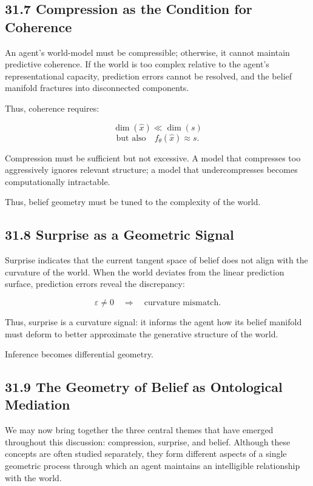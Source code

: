 \documentclass[12pt,letterpaper]{article}
\theoremstyle{remark}
\begin{document}
\subsection{31.7 Compression as the Condition for Coherence}

An agent’s world-model must be compressible; otherwise, it cannot maintain predictive coherence. If the world is too complex relative to the agent’s representational capacity, prediction errors cannot be resolved, and the belief manifold fractures into disconnected components.

Thus, coherence requires:

\[
\dim(\hat{x}) \ll \dim(s)
\]
\[
\text{but also} \quad f_\theta(\hat{x}) \approx s.
\]

Compression must be sufficient but not excessive.  
A model that compresses too aggressively ignores relevant structure; a model that undercompresses becomes computationally intractable.

Thus, belief geometry must be tuned to the complexity of the world.

\subsection{31.8 Surprise as a Geometric Signal}

Surprise indicates that the current tangent space of belief does not align with the curvature of the world. When the world deviates from the linear prediction surface, prediction errors reveal the discrepancy:

\[
\varepsilon \neq 0 \quad \Rightarrow \quad \text{curvature mismatch}.
\]

Thus, surprise is a curvature signal: it informs the agent how its belief manifold must deform to better approximate the generative structure of the world.

Inference becomes differential geometry.

\subsection{31.9 The Geometry of Belief as Ontological Mediation}

We may now bring together the three central themes that have emerged throughout this discussion: compression, surprise, and belief. Although these concepts are often studied separately, they form different aspects of a single geometric process through which an agent maintains an intelligible relationship with the world.
\end{document}
